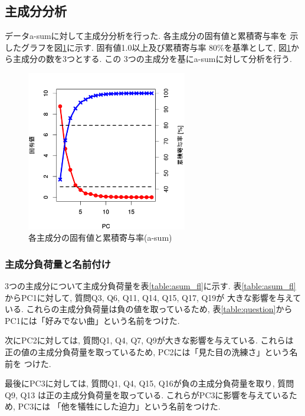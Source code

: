 \documentclass[12pt, a4j]{jsarticle}
\begin{document}
    \subsection{主成分分析}
      データa-sumに対して主成分分析を行った. 各主成分の固有値と累積寄与率を
      示したグラフを図\ref{fig:asum_eval}に示す. 固有値1.0以上及び累積寄与率
      80\%を基準として, 図\ref{fig:asum_eval}から主成分の数を3つとする. この
      3つの主成分を基にa-sumに対して分析を行う. 

      \begin{figure}[htb]
        \centering
        \includegraphics[width=7cm]{../2nd/a-sum/scree.bmp}
        \caption{各主成分の固有値と累積寄与率(a-sum)}
        \label{fig:asum_eval}
      \end{figure}

      \subsubsection{主成分負荷量と名前付け}
      3つの主成分について主成分負荷量を表\ref{table:asum_fl}に示す. 
      表\ref{table:asum_fl}からPC1に対して, 質問Q3, Q6, Q11, Q14, Q15, Q17, Q19が
      大きな影響を与えている. これらの主成分負荷量は負の値を取っているため, 
      表\ref{table:question}からPC1には「好みでない曲」という名前をつけた.  

      次にPC2に対しては, 質問Q1, Q4, Q7, Q9が大きな影響を与えている. これらは
      正の値の主成分負荷量を取っているため, PC2には「見た目の洗練さ」という名前を
      つけた.  

      最後にPC3に対しては, 質問Q1, Q4, Q15, Q16が負の主成分負荷量を取り, 質問Q9, Q13
      は正の主成分負荷量を取っている. これらがPC3に影響を与えているため, PC3には
      「他を犠牲にした迫力」という名前をつけた. 
\end{document}
